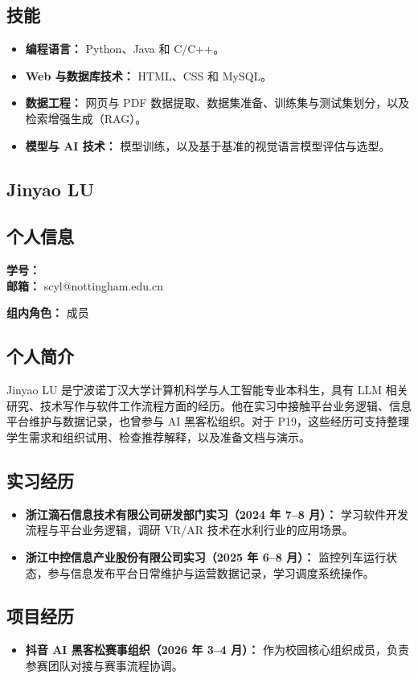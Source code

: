 \documentclass[a4paper,12pt]{article}
\newcommand{\PersonalInformation}[2]{%
  \subsection*{个人信息}
  \if\relax\detokenize{#1}\relax\else
  \noindent\textbf{学号：} #1\\
  \fi
  \textbf{邮箱：} #2\par
}
\begin{document}
\subsection*{技能}
\begin{itemize}
  \item \textbf{编程语言：} Python、Java 和 C/C++。
  \item \textbf{Web 与数据库技术：} HTML、CSS 和 MySQL。
  \item \textbf{数据工程：} 网页与 PDF 数据提取、数据集准备、训练集与测试集划分，以及检索增强生成（RAG）。
  \item \textbf{模型与 AI 技术：} 模型训练，以及基于基准的视觉语言模型评估与选型。
\end{itemize}

\subsection{Jinyao LU}
\PersonalInformation{}{scyl@nottingham.edu.cn}
\noindent\textbf{组内角色：} 成员\par

\subsection*{个人简介}
Jinyao LU 是宁波诺丁汉大学计算机科学与人工智能专业本科生，具有 LLM 相关研究、技术写作与软件工作流程方面的经历。他在实习中接触平台业务逻辑、信息平台维护与数据记录，也曾参与 AI 黑客松组织。对于 P19，这些经历可支持整理学生需求和组织试用、检查推荐解释，以及准备文档与演示。

\subsection*{实习经历}
\begin{itemize}
  \item \textbf{浙江滴石信息技术有限公司研发部门实习（2024 年 7--8 月）：} 学习软件开发流程与平台业务逻辑，调研 VR/AR 技术在水利行业的应用场景。
  \item \textbf{浙江中控信息产业股份有限公司实习（2025 年 6--8 月）：} 监控列车运行状态，参与信息发布平台日常维护与运营数据记录，学习调度系统操作。
\end{itemize}

\subsection*{项目经历}
\begin{itemize}
  \item \textbf{抖音 AI 黑客松赛事组织（2026 年 3--4 月）：} 作为校园核心组织成员，负责参赛团队对接与赛事流程协调。
\end{itemize}
\end{document}
